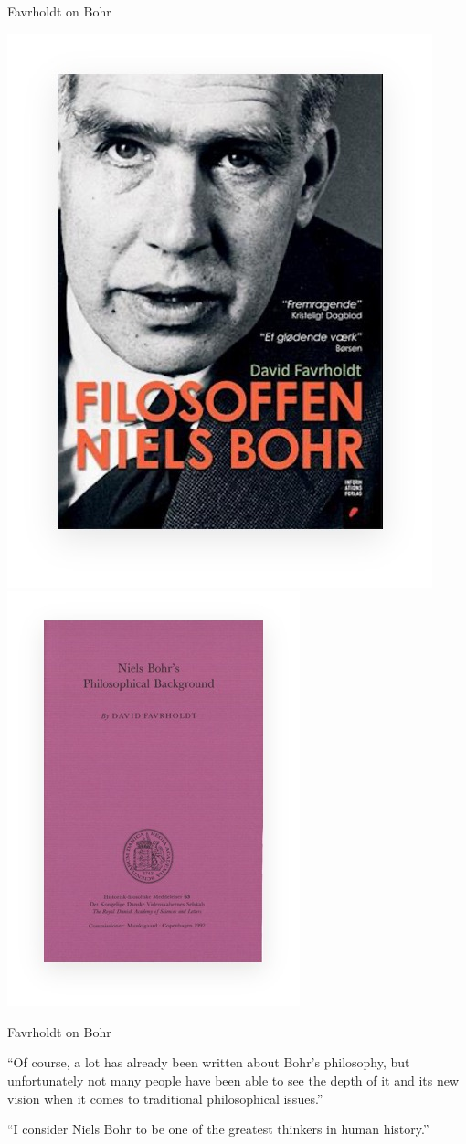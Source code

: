 \begin{frame}{Favrholdt on Bohr}
  \begin{center}
    \includegraphics[width=0.45\linewidth]{favrholdt-filosoffen.jpg}%
    \hfill
    \includegraphics[width=0.45\linewidth]{favrholdt-background.jpg}
  \end{center}
\end{frame}

\begin{frame}{Favrholdt on Bohr}
  
  ``Of course, a lot has already been written about Bohr's philosophy,
  but unfortunately not many people have been able to see the depth of
  it and its new vision when it comes to traditional philosophical
  issues.'' \citep{favrholdt2015} 

  ``I consider Niels Bohr to be one of the greatest thinkers in human
  history.'' \citep{favrholdt2015}

\nocite{favrholdt-background}  

\end{frame}

